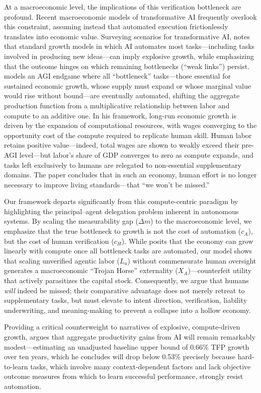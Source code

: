 \documentclass[12pt, letter]{article}
\begin{document}
At a macroeconomic level, the implications of this verification bottleneck are profound. Recent macroeconomic models of transformative AI frequently overlook this constraint, assuming instead that automated execution frictionlessly translates into economic value. Surveying scenarios for transformative AI, \citet{Jones2026AI} notes that standard growth models in which AI automates most tasks—including tasks involved in producing new ideas—can imply explosive growth, while emphasizing that the outcome hinges on which remaining bottlenecks (``weak links'') persist. \citet{Restrepo2025} models an AGI endgame where all ``bottleneck'' tasks---those essential for sustained economic growth, whose supply must expand or whose marginal value would rise without bound---are eventually automated, shifting the aggregate production function from a multiplicative relationship between labor and compute to an additive one. In his framework, long-run economic growth is driven by the expansion of computational resources, with wages converging to the opportunity cost of the compute required to replicate human skill. Human labor retains positive value---indeed, total wages are shown to weakly exceed their pre-AGI level---but labor's share of GDP converges to zero as compute expands, and tasks left exclusively to humans are relegated to non-essential supplementary domains. The paper concludes that in such an economy, human effort is no longer necessary to improve living standards---that ``we won't be missed.''

Our framework departs significantly from this compute-centric paradigm by highlighting the principal--agent delegation problem inherent in autonomous systems. By scaling the measurability gap ($\Delta m$) to the macroeconomic level, we emphasize that the true bottleneck to growth is not the cost of automation ($c_A$), but the cost of human verification ($c_H$). While \citet{Restrepo2025} posits that the economy can grow linearly with compute once all bottleneck tasks are automated, our model shows that scaling unverified agentic labor ($L_a$) without commensurate human oversight generates a macroeconomic ``Trojan Horse'' externality ($X_A$)---counterfeit utility that actively parasitizes the capital stock. Consequently, we argue that humans \emph{will} indeed be missed; their comparative advantage does not merely retreat to supplementary tasks, but must elevate to intent direction, verification, liability underwriting, and meaning-making to prevent a collapse into a hollow economy.

Providing a critical counterweight to narratives of explosive, compute-driven growth, \citet{Acemoglu2025} argues that aggregate productivity gains from AI will remain remarkably modest---estimating an unadjusted baseline upper bound of 0.66\% TFP growth over ten years, which he concludes will drop below 0.53\% precisely because hard-to-learn tasks, which involve many context-dependent factors and lack objective outcome measures from which to learn successful performance, strongly resist automation.
\end{document}

